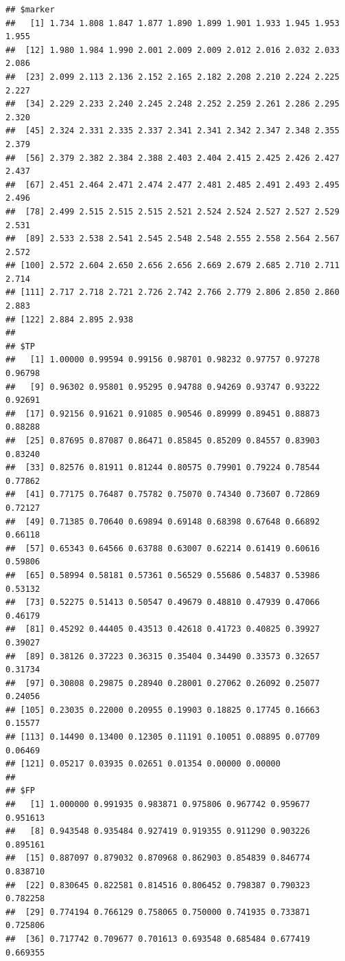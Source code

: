 \documentclass{article}\usepackage[]{graphicx}\usepackage[]{color}
\makeatletter
\newenvironment{kframe}{%
 \def\at@end@of@kframe{}%
 \ifinner\ifhmode%
  \def\at@end@of@kframe{\end{minipage}}%
  \begin{minipage}{\columnwidth}%
 \fi\fi%
 \def\FrameCommand##1{\hskip\@totalleftmargin \hskip-\fboxsep
 \colorbox{shadecolor}{##1}\hskip-\fboxsep
     \hskip-\linewidth \hskip-\@totalleftmargin \hskip\columnwidth}%
 \MakeFramed {\advance\hsize-\width
   \@totalleftmargin\z@ \linewidth\hsize
   \@setminipage}}%
 {\par\unskip\endMakeFramed%
 \at@end@of@kframe}
\newenvironment{knitrout}{}{} %
\makeatother
\begin{document}
\begin{knitrout}
{}


\begin{kframe}\begin{verbatim}
## $marker
##   [1] 1.734 1.808 1.847 1.877 1.890 1.899 1.901 1.933 1.945 1.953 1.955
##  [12] 1.980 1.984 1.990 2.001 2.009 2.009 2.012 2.016 2.032 2.033 2.086
##  [23] 2.099 2.113 2.136 2.152 2.165 2.182 2.208 2.210 2.224 2.225 2.227
##  [34] 2.229 2.233 2.240 2.245 2.248 2.252 2.259 2.261 2.286 2.295 2.320
##  [45] 2.324 2.331 2.335 2.337 2.341 2.341 2.342 2.347 2.348 2.355 2.379
##  [56] 2.379 2.382 2.384 2.388 2.403 2.404 2.415 2.425 2.426 2.427 2.437
##  [67] 2.451 2.464 2.471 2.474 2.477 2.481 2.485 2.491 2.493 2.495 2.496
##  [78] 2.499 2.515 2.515 2.515 2.521 2.524 2.524 2.527 2.527 2.529 2.531
##  [89] 2.533 2.538 2.541 2.545 2.548 2.548 2.555 2.558 2.564 2.567 2.572
## [100] 2.572 2.604 2.650 2.656 2.656 2.669 2.679 2.685 2.710 2.711 2.714
## [111] 2.717 2.718 2.721 2.726 2.742 2.766 2.779 2.806 2.850 2.860 2.883
## [122] 2.884 2.895 2.938
## 
## $TP
##   [1] 1.00000 0.99594 0.99156 0.98701 0.98232 0.97757 0.97278 0.96798
##   [9] 0.96302 0.95801 0.95295 0.94788 0.94269 0.93747 0.93222 0.92691
##  [17] 0.92156 0.91621 0.91085 0.90546 0.89999 0.89451 0.88873 0.88288
##  [25] 0.87695 0.87087 0.86471 0.85845 0.85209 0.84557 0.83903 0.83240
##  [33] 0.82576 0.81911 0.81244 0.80575 0.79901 0.79224 0.78544 0.77862
##  [41] 0.77175 0.76487 0.75782 0.75070 0.74340 0.73607 0.72869 0.72127
##  [49] 0.71385 0.70640 0.69894 0.69148 0.68398 0.67648 0.66892 0.66118
##  [57] 0.65343 0.64566 0.63788 0.63007 0.62214 0.61419 0.60616 0.59806
##  [65] 0.58994 0.58181 0.57361 0.56529 0.55686 0.54837 0.53986 0.53132
##  [73] 0.52275 0.51413 0.50547 0.49679 0.48810 0.47939 0.47066 0.46179
##  [81] 0.45292 0.44405 0.43513 0.42618 0.41723 0.40825 0.39927 0.39027
##  [89] 0.38126 0.37223 0.36315 0.35404 0.34490 0.33573 0.32657 0.31734
##  [97] 0.30808 0.29875 0.28940 0.28001 0.27062 0.26092 0.25077 0.24056
## [105] 0.23035 0.22000 0.20955 0.19903 0.18825 0.17745 0.16663 0.15577
## [113] 0.14490 0.13400 0.12305 0.11191 0.10051 0.08895 0.07709 0.06469
## [121] 0.05217 0.03935 0.02651 0.01354 0.00000 0.00000
## 
## $FP
##   [1] 1.000000 0.991935 0.983871 0.975806 0.967742 0.959677 0.951613
##   [8] 0.943548 0.935484 0.927419 0.919355 0.911290 0.903226 0.895161
##  [15] 0.887097 0.879032 0.870968 0.862903 0.854839 0.846774 0.838710
##  [22] 0.830645 0.822581 0.814516 0.806452 0.798387 0.790323 0.782258
##  [29] 0.774194 0.766129 0.758065 0.750000 0.741935 0.733871 0.725806
##  [36] 0.717742 0.709677 0.701613 0.693548 0.685484 0.677419 0.669355

\end{verbatim}
\end{kframe}
\end{knitrout}
\end{document}
